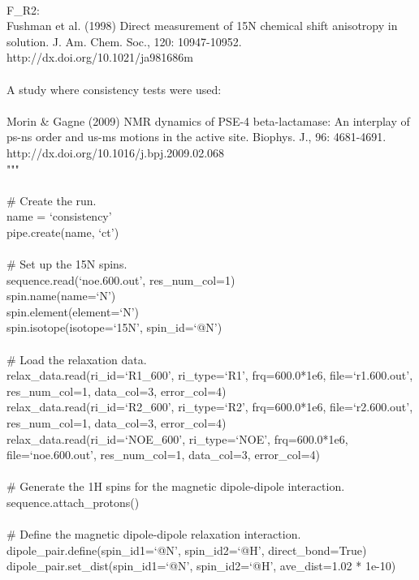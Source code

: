 \begin{exampleenv}
 \\
    F\_R2: \\
        Fushman et al. (1998) Direct measurement of 15N chemical shift anisotropy in solution. J. Am. Chem. Soc., 120: 10947-10952. http://dx.doi.org/10.1021/ja981686m \\
 \\
A study where consistency tests were used: \\
 \\
    Morin \& Gagne (2009) NMR dynamics of PSE-4 beta-lactamase: An interplay of ps-ns order and us-ms motions in the active site. Biophys. J., 96: 4681-4691. http://dx.doi.org/10.1016/j.bpj.2009.02.068  \\
""" \\
 \\
\# Create the run. \\
name = `consistency' \\
pipe.create(name, `ct') \\
 \\
\# Set up the 15N spins. \\
sequence.read(`noe.600.out', res\_num\_col=1) \\
spin.name(name=`N') \\
spin.element(element=`N') \\
spin.isotope(isotope=`15N', spin\_id=`@N') \\
 \\
\# Load the relaxation data. \\
relax\_data.read(ri\_id=`R1\_600',  ri\_type=`R1',  frq=600.0*1e6, file=`r1.600.out',  res\_num\_col=1, data\_col=3, error\_col=4) \\
relax\_data.read(ri\_id=`R2\_600',  ri\_type=`R2',  frq=600.0*1e6, file=`r2.600.out',  res\_num\_col=1, data\_col=3, error\_col=4) \\
relax\_data.read(ri\_id=`NOE\_600', ri\_type=`NOE', frq=600.0*1e6, file=`noe.600.out', res\_num\_col=1, data\_col=3, error\_col=4) \\
 \\
\# Generate the 1H spins for the magnetic dipole-dipole interaction. \\
sequence.attach\_protons() \\
 \\
\# Define the magnetic dipole-dipole relaxation interaction. \\
dipole\_pair.define(spin\_id1=`@N', spin\_id2=`@H', direct\_bond=True) \\
dipole\_pair.set\_dist(spin\_id1=`@N', spin\_id2=`@H', ave\_dist=1.02 * 1e-10) \\

\end{exampleenv}

